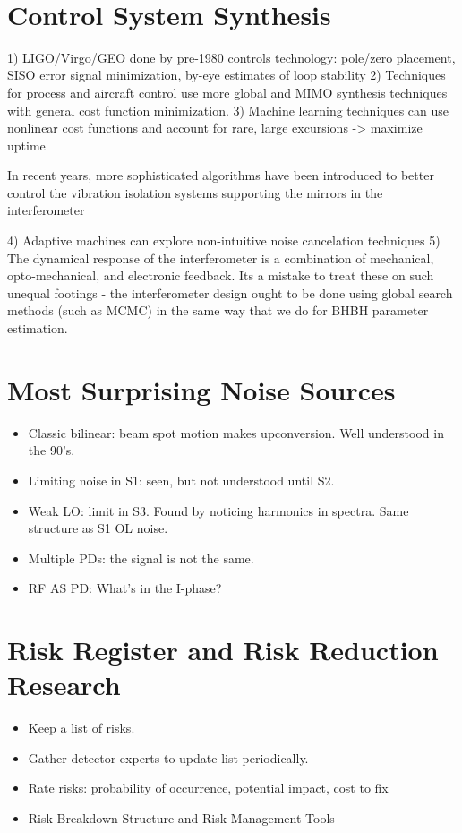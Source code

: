 ​\section{Control System Synthesis}
  1) LIGO/Virgo/GEO done by pre-1980 controls technology: pole/zero placement, SISO error signal minimization, by-eye estimates of loop stability
  2) Techniques for process and aircraft control use more global and MIMO synthesis techniques with general cost function minimization.
  3) Machine learning techniques can use nonlinear cost functions and account for rare, large excursions -> maximize uptime

In recent years, more sophisticated algorithms have been introduced to better control the vibration isolation
systems supporting the mirrors in the interferometer\cite{Beker:2014, Driggers:2012fl, Ryan:FFW2012}

  4) Adaptive machines can explore non-intuitive noise cancelation techniques​
  5) The dynamical response of the interferometer is a combination of mechanical, opto-mechanical, and electronic feedback. Its a mistake to treat these on such unequal footings - the interferometer design ought to be done using global search methods (such as MCMC) in the same way that we do for BHBH parameter estimation.

\section{Most Surprising Noise Sources}
\begin{itemize}
\item Classic bilinear: beam spot motion makes upconversion. Well understood in the 90's.
\item Limiting noise in S1: seen, but not understood until S2.
\item Weak LO: limit in S3. Found by noticing harmonics in spectra. Same structure as S1 OL noise.
\item Multiple PDs: the signal is not the same.
\item RF AS PD: What's in the I-phase?

\end{itemize}

\section{Risk Register and Risk Reduction Research}
\begin{itemize}
\item Keep a list of risks.
\item Gather detector experts to update list periodically.
\item Rate risks: probability of occurrence, potential impact, cost to fix
\item Risk Breakdown Structure and Risk Management Tools
\end{itemize}

